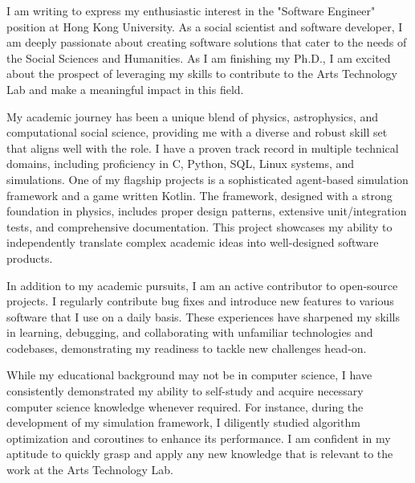 \documentclass[11pt, a4paper]{awesome-cv}
\begin{document}
\makecvheader[R]

\makecvfooter
  {}%
  {}%
  {}

\makelettertitle

\begin{cvletter}

I am writing to express my enthusiastic interest in the "Software Engineer" position at Hong Kong University. As a social scientist and software developer, I am deeply passionate about creating software solutions that cater to the needs of the Social Sciences and Humanities. As I am finishing my Ph.D., I am excited about the prospect of leveraging my skills to contribute to the Arts Technology Lab and make a meaningful impact in this field.

My academic journey has been a unique blend of physics, astrophysics, and computational social science, providing me with a diverse and robust skill set that aligns well with the role. I have a proven track record in multiple technical domains, including proficiency in C, Python, SQL, Linux systems, and simulations. One of my flagship projects is a sophisticated agent-based simulation framework and a game written Kotlin. The framework, designed with a strong foundation in physics, includes proper design patterns, extensive unit/integration tests, and comprehensive documentation. This project showcases my ability to independently translate complex academic ideas into well-designed software products.

In addition to my academic pursuits, I am an active contributor to open-source projects. I regularly contribute bug fixes and introduce new features to various software that I use on a daily basis. These experiences have sharpened my skills in learning, debugging, and collaborating with unfamiliar technologies and codebases, demonstrating my readiness to tackle new challenges head-on.

While my educational background may not be in computer science, I have consistently demonstrated my ability to self-study and acquire necessary computer science knowledge whenever required. For instance, during the development of my simulation framework, I diligently studied algorithm optimization and coroutines to enhance its performance. I am confident in my aptitude to quickly grasp and apply any new knowledge that is relevant to the work at the Arts Technology Lab.


\end{cvletter}
\end{document}
